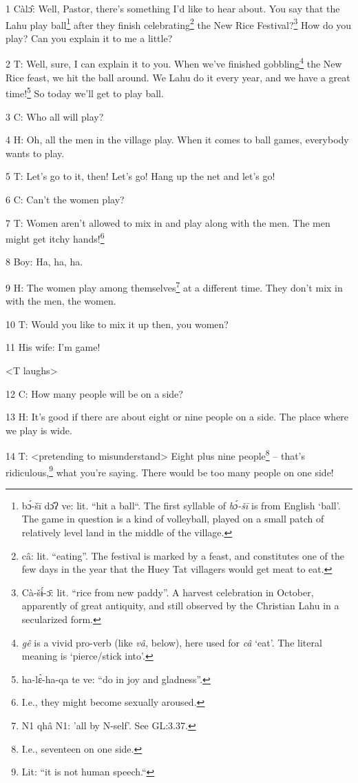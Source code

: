 
1 Càlɔ̂: Well, Pastor, there's something I'd like to hear about. You say that
the Lahu play ball\footnote{bɔ́-šī dɔ̂ʔ ve: lit. ``hit a ball``. The first syllable of \textit{bɔ́-šī}  is from English `ball'. The game in question is a kind of volleyball, played on a small patch of relatively level land in the middle of the village.} after they finish celebrating\footnote{câ: lit. ``eating''. The festival is marked by a feast, and constitutes one of the few days in the year that the Huey Tat villagers would get meat to eat.} the New Rice Festival?\footnote{Cà-šɨ́-ɔ̄: lit. ``rice from new paddy''. A harvest celebration in October, apparently of great antiquity, and still observed by the Christian Lahu in a secularized form.}
How do you play? Can you explain it to me a little?

2 T: Well, sure, I can explain it to you. When we've finished gobbling\footnote{\textit{gê} is a vivid pro-verb (like \textit{vâ,} below), here used for \textit{câ} `eat'. The literal meaning is `pierce/stick into'.} the New
Rice feast, we hit the ball around. We Lahu do it every year, and we have a great
time!\footnote{ha-lɛ̀-ha-qa te ve: ``do in joy and gladness''.} So today we'll get to play ball.

3 C: Who all will play?

4 H: Oh, all the men in the village play. When it comes to ball games, everybody
wants to play.

5 T: Let's go to it, then! Let's go! Hang up the net and let's go!

6 C: Can't the women play?

7 T: Women aren't allowed to mix in and play along with the men. The men might
get itchy hands!\footnote{I.e., they might become sexually aroused.}

8 Boy: Ha, ha, ha.

9 H: The women play among themselves\footnote{N1 qhâ N1: 'all by N-self'. See GL:3.37.} at a different time. They don't mix in
with the men, the women.

10 T: Would you like to mix it up then, you women?

11 His wife: I'm game!

<T laughs>

12 C: How many people will be on a side?

13 H: It's good if there are about eight or nine people on a side. The place where
we play is wide.

14 T: <pretending to misunderstand> Eight plus nine people\footnote{I.e., seventeen on one side.}
-- that's ridiculous,\footnote{Lit: ``it is not human speech.``} what you're saying. There would be too many people on
one side!

